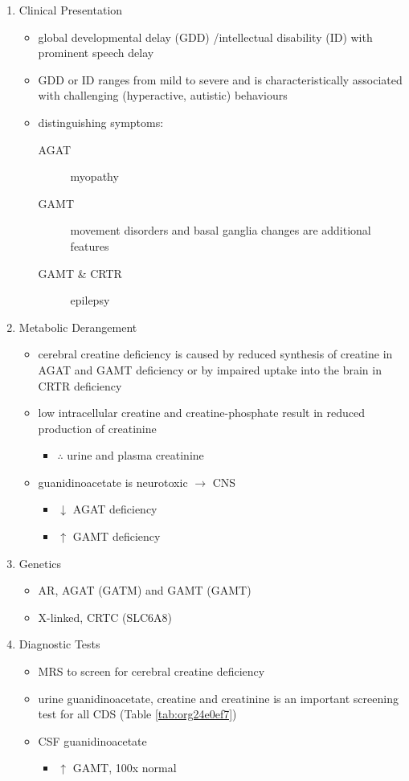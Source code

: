 \documentclass{scrartcl}
\begin{document}
\begin{enumerate}
\item Clinical Presentation
\label{sec:org65fd85a}
\begin{itemize}
\item global developmental delay (GDD) /intellectual disability (ID) with
prominent speech delay
\item GDD or ID ranges from mild to severe and is characteristically
associated with challenging (hyperactive, autistic) behaviours
\item distinguishing symptoms:
\begin{description}
\item[{AGAT}] myopathy
\item[{GAMT}] movement disorders and basal ganglia changes are
additional features
\item[{GAMT \& CRTR}] epilepsy
\end{description}
\end{itemize}

\item Metabolic Derangement
\label{sec:orga94f80a}
\begin{itemize}
\item cerebral creatine deficiency is caused by reduced synthesis of
creatine in AGAT and GAMT deficiency or by impaired uptake into the
brain in CRTR deficiency
\item low intracellular creatine and creatine-phosphate result in reduced
production of creatinine
\begin{itemize}
\item \(\therefore\) \low urine and plasma creatinine
\end{itemize}
\item guanidinoacetate is neurotoxic \(\to\) CNS
\begin{itemize}
\item \(\downarrow\) AGAT deficiency
\item \(\uparrow\) GAMT deficiency
\end{itemize}
\end{itemize}

\item Genetics
\label{sec:org01970e2}
\begin{itemize}
\item AR, AGAT (GATM) and GAMT (GAMT)
\item X-linked, CRTC (SLC6A8)
\end{itemize}
\item Diagnostic Tests
\label{sec:org0ec979a}
\begin{itemize}
\item MRS to screen for cerebral creatine deficiency
\item urine guanidinoacetate, creatine and creatinine is an important
screening test for all CDS (Table \ref{tab:org24e0ef7})
\item CSF guanidinoacetate
\begin{itemize}
\item \(\uparrow\) GAMT, 100x normal
\end{itemize}
\end{itemize}




\end{enumerate}
\end{document}
